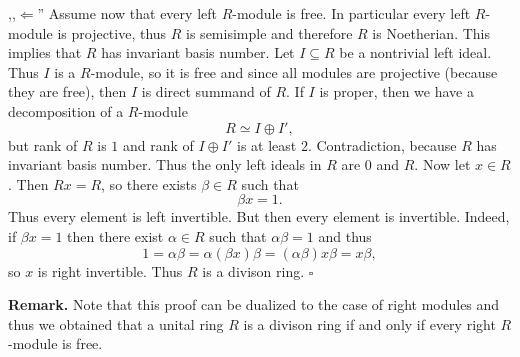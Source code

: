 \documentclass[12pt]{article}
\begin{document}
,,$\Leftarrow$'' Assume now that every left $R$-module is free. In particular every left $R$-module is projective, thus $R$ is semisimple and therefore $R$ is Noetherian. This implies that $R$ has invariant basis number. Let $I\subseteq R$ be a nontrivial left ideal. Thus $I$ is a $R$-module, so it is free and since all modules are projective (because they are free), then $I$ is direct summand of $R$. If $I$ is proper, then we have a decomposition of a $R$-module
$$R\simeq I\oplus I',$$
but rank of $R$ is $1$ and rank of $I\oplus I'$ is at least $2$. Contradiction, because $R$ has invariant basis number. Thus the only left ideals in $R$ are $0$ and $R$. Now let $x\in R$. Then $Rx=R$, so there exists $\beta\in R$ such that $$\beta x=1.$$
Thus every element is left invertible. But then every element is invertible. Indeed, if $\beta x=1$ then there exist $\alpha\in R$ such that $\alpha\beta =1$ and thus
$$1=\alpha\beta=\alpha(\beta x)\beta=(\alpha\beta)x\beta=x\beta,$$
so $x$ is right invertible. Thus $R$ is a divison ring. $\square$


\textbf{Remark.} Note that this proof can be dualized to the case of right modules and thus we obtained that a unital ring $R$ is a divison ring if and only if every right $R$-module is free.
\end{document}
